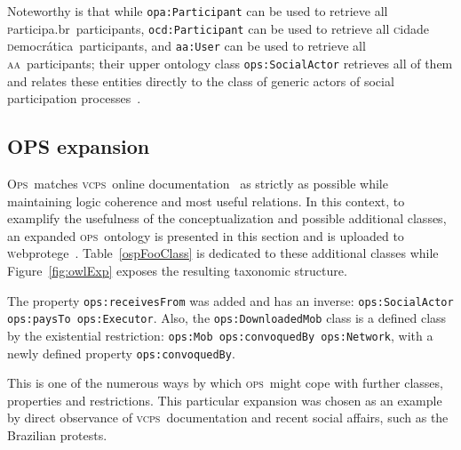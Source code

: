 \documentclass[10pt,letterpaper]{article}
\newcommand{\ops}{\textsc{ops}}
\newcommand{\opsi}{O\textsc{ps}}
\newcommand{\vcps}{\textsc{vcps}}
\newcommand{\aan}{\textsc{aa}}
\newcommand{\cidadedemocratica}{\textsc{c}idade \textsc{d}emocr\'atica}
\newcommand{\participa}{\textsc{p}articipa.br}
\newcommand{\webprotege}{\textsc{w}ebprotege}
\begin{document}
Noteworthy is that while {\tt opa:Participant} can be used to retrieve all \participa\ participants,
{\tt ocd:Participant} can be used to retrieve all \cidadedemocratica\ participants,
and {\tt aa:User} can be used to retrieve all \aan\ participants;
their upper ontology class {\tt ops:SocialActor} retrieves all of them
and relates these entities directly to the class of generic actors of social participation processes~\cite{pnud5}.

\subsection{OPS expansion}\label{downwards}
\opsi\ matches \vcps\ online documentation~\cite{corais} as strictly as possible while maintaining logic coherence
and most useful relations.
In this context, to examplify the usefulness of the conceptualization
and possible additional classes,
an expanded \ops\ ontology is presented in this section 
and is uploaded to \webprotege~\cite{owlExp}.
Table~\ref{ospFooClass} is dedicated to these additional classes
while Figure~\ref{fig:owlExp} exposes the resulting taxonomic structure.

The property {\tt ops:receivesFrom} was added and has an inverse:
\texttt{ops:SocialActor ops:paysTo ops:Executor}.
Also, the {\tt ops:DownloadedMob} class is a defined class by the existential restriction:
\texttt{ops:Mob ops:convoquedBy ops:Network}, with a newly defined property \texttt{ops:convoquedBy}.

This is one of the numerous ways by which \ops\ might cope with further classes,
properties and restrictions.
This particular expansion was chosen as an example by direct observance of
\vcps\ documentation and recent social affairs,
such as the Brazilian protests.
\end{document}
